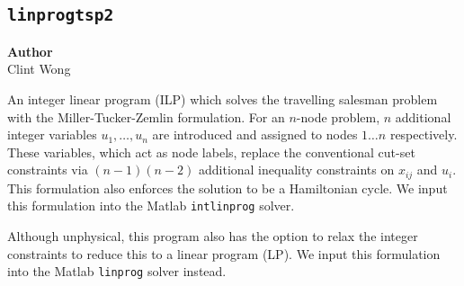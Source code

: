 \subsection{\texttt{linprogtsp2}}
\label{subsec:linprogtsp2}

\begin{flushright}
\textbf{Author} \\
Clint Wong
\end{flushright}

An integer linear program (ILP) which solves the travelling salesman problem with the Miller-Tucker-Zemlin formulation. For an $n$-node problem, $n$ additional integer variables $u_1, \dots ,u_n$ are introduced and assigned to nodes $1\dots n$ respectively. These variables, which act as node labels, replace the conventional cut-set constraints via $(n-1)(n-2)$ additional inequality constraints on $x_{ij}$ and $u_i$. This formulation also enforces the solution to be a Hamiltonian cycle. We input this formulation into the Matlab \texttt{intlinprog} solver.  

Although unphysical, this program also has the option to relax the integer constraints to reduce this to a linear program (LP). We input this formulation into the Matlab \texttt{linprog} solver instead. 



